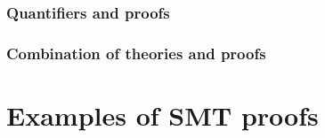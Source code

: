 \documentclass[svgnames,table,mathserif]{beamer}
\begin{document}

\begin{frame}
  \frametitle{Quantifiers and proofs}

\end{frame}


\begin{frame}
  \frametitle{Combination of theories and proofs}

\end{frame}




















\section{Examples of SMT proofs}
\end{document}
